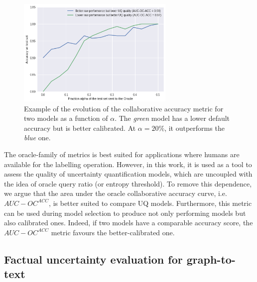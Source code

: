 \begin{figure}
     \centering    
     \includegraphics[width=0.67\textwidth]{figures/eval/metrics/oracle_collab_acc.png}
     \caption{Example of the evolution of the collaborative accuracy metric for two models as a function of $\alpha$. The \textit{green} model has a lower default accuracy but is better calibrated. At $\alpha=20\%$, it outperforms the \textit{blue} one.}
     \label{fig:example-uq-classification-metrics}
    
\end{figure}

The oracle-family of metrics is best suited for applications where humans are available for the labelling operation\cite{collaborativeUQMetrics2021}. However, in this work, it is used as a tool to assess the quality of uncertainty quantification models, which are uncoupled with the idea of oracle query ratio (or entropy threshold). To remove this dependence, we argue that the area under the oracle collaborative accuracy curve, i.e. $AUC-OC^{ACC}$,  is better suited to compare UQ models. Furthermore, this metric can be used during model selection to produce not only performing models but also calibrated ones. Indeed, if two models have a comparable accuracy score, the $AUC-OC^{ACC}$ metric favours the better-calibrated one.



\subsection{Factual uncertainty evaluation for graph-to-text} \label{factual-uq-metrics}

